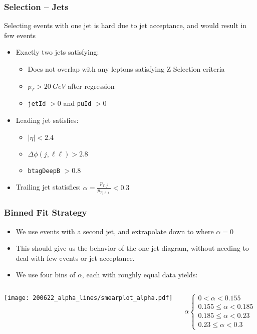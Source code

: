 \documentclass{beamer}
\begin{document}
\begin{frame}
  \frametitle{Selection -- Jets}

  Selecting events with one jet is hard due to jet acceptance,
  and would result in few events

  \vfill

  \begin{itemize}
  \item Exactly two jets satisfying:
    \begin{itemize}
    \item Does not overlap with any leptons satisfying Z Selection criteria
    \item $p_T > \SI{20}{GeV}$ after regression
    \item \texttt{jetId} $> 0$ and \texttt{puId} $> 0$
    \end{itemize}
  \item Leading jet satisfies:
    \begin{itemize}
    \item $|\eta| < 2.4$
    \item $\Delta\phi(j, \ell\ell) > 2.8$
    \item \texttt{btagDeepB} $> 0.8$
    \end{itemize}
  \item Trailing jet statisfies: $\alpha = \frac{p_{T, j}}{p_{T, \ell\ell}} < 0.3$
  \end{itemize}

\end{frame}


\begin{frame}
  \frametitle{Binned Fit Strategy}

  \begin{itemize}
  \item We use events with a second jet, and extrapolate down to where $\alpha = 0$
  \item This should give us the behavior of the one jet diagram,
    without needing to deal with few events or jet acceptance.
  \item We use four bins of $\alpha$, each with roughly equal data yields:
  \end{itemize}
  \begin{columns}
    \begin{column}{0.5\linewidth}
      \texttt{[image: 200622\_alpha\_lines/smearplot\_alpha.pdf]}
    \end{column}
    \begin{column}{0.5\linewidth}
      \[
      \alpha
      \begin{cases}
        0 < \alpha < 0.155 \\
        0.155 \le \alpha < 0.185 \\
        0.185 \le \alpha < 0.23 \\
        0.23 \le \alpha < 0.3
      \end{cases}
      \]
    \end{column}
  \end{columns}

\end{frame}
\end{document}
